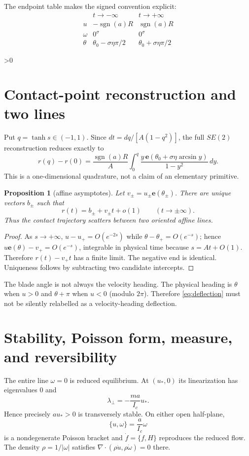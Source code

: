 \documentclass[9pt]{extarticle}
\newtheorem{proposition}{Proposition}
\newcommand{\ee}{\mathbf e}
\newcommand{\sgn}{\operatorname{sgn}}
\begin{document}
The endpoint table makes the signed convention explicit:
\[
\begin{array}{c|cc}
 &t\to-\infty&t\to+\infty\\ \hline
u&-\sgn(a)R&\sgn(a)R\\
\omega&0^\sigma&0^\sigma\\
\theta&\theta_0-\sigma\eta\pi/2&\theta_0+\sigma\eta\pi/2
\end{array}
\]

\ifnum\CRevisionRound>0
\section{Contact-point reconstruction and two lines}
Put $q=\tanh s\in(-1,1)$.  Since $dt=dq/[A(1-q^2)]$, the full $SE(2)$
reconstruction reduces exactly to
\begin{equation}\label{eq:quad}
 r(q)-r(0)=\frac{\sgn(a)R}{A}
 \int_0^q\frac{y\,\ee(\theta_0+\sigma\eta\arcsin y)}{1-y^2}\,dy.
\end{equation}
This is a one-dimensional quadrature, not a claim of an elementary primitive.

\begin{proposition}[affine asymptotes]
Let $v_\pm=u_\pm\ee(\theta_\pm)$.  There are unique vectors $b_\pm$ such
that
\[
 r(t)=b_\pm+v_\pm t+o(1)\qquad(t\to\pm\infty).
\]
Thus the contact trajectory scatters between two oriented affine lines.
\end{proposition}
\begin{proof}
As $s\to+\infty$, $u-u_+=O(e^{-2s})$ while
$\theta-\theta_+=O(e^{-s})$; hence
$u\ee(\theta)-v_+=O(e^{-s})$, integrable in physical time because $s=At+O(1)$.
Therefore $r(t)-v_+t$ has a finite limit.  The negative end is identical.
Uniqueness follows by subtracting two candidate intercepts.
\end{proof}

The blade angle is not always the velocity heading.  The physical heading is
$\theta$ when $u>0$ and $\theta+\pi$ when $u<0$ (modulo $2\pi$).  Therefore
\eqref{eq:deflection} must not be silently relabelled as a velocity-heading
deflection.

\section{Stability, Poisson form, measure, and reversibility}
The entire line $\omega=0$ is reduced equilibrium.  At $(u_*,0)$ its
linearization has eigenvalues $0$ and
\begin{equation}\label{eq:eigen}
 \lambda_\perp=-\frac{ma}{I_c}u_*.
\end{equation}
Hence precisely $au_*>0$ is transversely stable.  On either open half-plane,
\begin{equation}\label{eq:poisson}
 \{u,\omega\}=\frac{a}{I_c}\omega
\end{equation}
is a nondegenerate Poisson bracket and $\dot f=\{f,H\}$ reproduces the reduced
flow.  The density $\rho=1/|\omega|$ satisfies
$\nabla\!\cdot(\rho\dot u,\rho\dot\omega)=0$ there.
\end{document}
